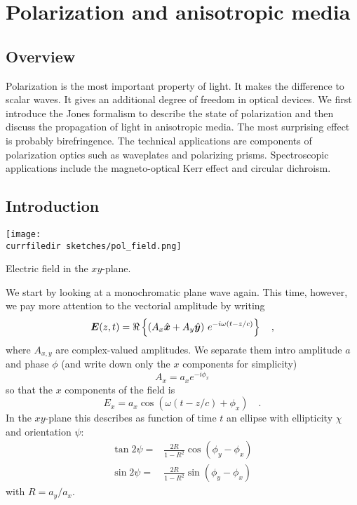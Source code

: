 \renewcommand{\lastmod}{December 8, 2023}
\renewcommand{\chapterauthors}{Markus Lippitz}

\chapter{Polarization and anisotropic media}





\section{Overview}

Polarization is the most important property of light. It makes the difference to scalar waves. It gives an additional degree of freedom in optical devices. We first introduce the Jones formalism to describe the state of polarization and then discuss the propagation of light in anisotropic media. The most surprising effect is probably birefringence. The technical applications are components of polarization optics such as waveplates and polarizing prisms. Spectroscopic applications include the magneto-optical Kerr effect and circular dichroism.


\section{Introduction}

\begin{marginfigure}
    \texttt{[image: \\currfiledir sketches/pol\_field.png]}
    \caption{Electric field in the $xy$-plane.}
\end{marginfigure}

We start by looking at a monochromatic plane wave again. This time, however, we pay more attention to the vectorial amplitude by writing
\begin{equation}
    \boldsymbol{E}(z,t) = \Re \left\{ 
    \left( A_x \hat{\boldsymbol{x}} + A_y \hat{\boldsymbol{y}} \right) \, e^{-i \omega (t - z/c)}
    \right\} \quad ,
\end{equation}
where $A_{x,y}$ are complex-valued amplitudes. We separate them intro amplitude $a$ and phase $\phi$ (and write down only the $x$ components for simplicity)
\begin{equation}
    A_x = a_x e^{-i \phi_x}
\end{equation}
so that the $x$ components of the field is
\begin{equation}
    E_x = a_x \cos \left( \omega (t - z/c) + \phi_x \right) \quad .
\end{equation}
In the $xy$-plane this describes as function of time $t$ an ellipse with ellipticity $\chi$ and orientation $\psi$:
\begin{align}
    \tan 2 \psi = & \frac{2 R}{1 - R^2} \cos (\phi_y - \phi_x) \\
    \sin 2 \psi = & \frac{2 R}{1 - R^2} \sin (\phi_y - \phi_x) 
\end{align}
with $R = a_y / a_x$.

